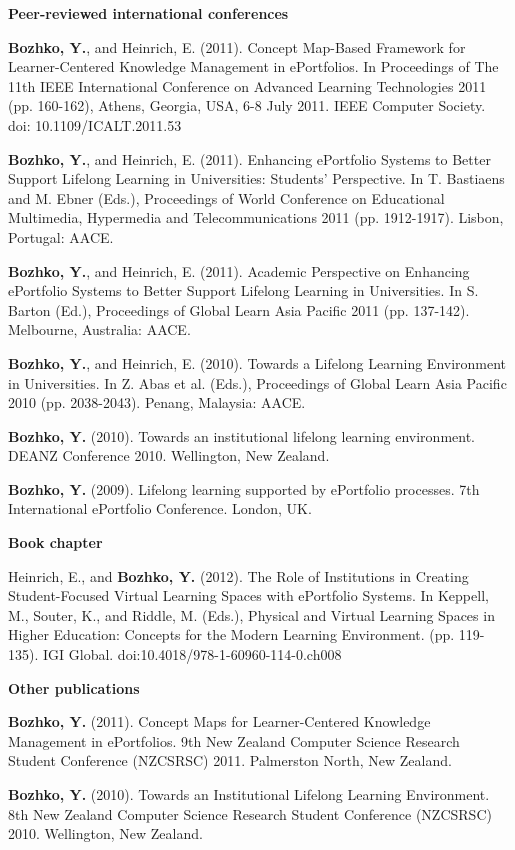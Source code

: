 \LARGE \textbf{Peer-reviewed international conferences}

\normalsize
\textbf{Bozhko, Y.}, and Heinrich, E. (2011). Concept Map-Based Framework for
Learner-Centered Knowledge Management in ePortfolios. In Proceedings of The 11th
IEEE International Conference on Advanced Learning Technologies 2011 (pp.
160-162), Athens, Georgia, USA, 6-8 July 2011. IEEE Computer Society. doi:
10.1109/ICALT.2011.53

\textbf{Bozhko, Y.}, and Heinrich, E. (2011). Enhancing ePortfolio Systems to
Better Support Lifelong Learning in Universities: Students' Perspective. In T.
Bastiaens and M. Ebner (Eds.), Proceedings of World Conference on Educational
Multimedia, Hypermedia and Telecommunications 2011 (pp. 1912-1917). Lisbon,
Portugal: AACE.

\textbf{Bozhko, Y.}, and Heinrich, E. (2011). Academic Perspective on Enhancing
ePortfolio Systems to Better Support Lifelong Learning in Universities. In S.
Barton (Ed.), Proceedings of Global Learn Asia Pacific 2011 (pp. 137-142).
Melbourne, Australia: AACE.

﻿\textbf{Bozhko, Y.}, and Heinrich, E. (2010). Towards a Lifelong Learning
Environment in Universities. In Z. Abas et al. (Eds.), Proceedings of Global
Learn Asia Pacific 2010 (pp. 2038-2043). Penang, Malaysia: AACE. 

\textbf{Bozhko, Y.} (2010). Towards an institutional lifelong learning
environment. DEANZ Conference 2010. Wellington, New Zealand.

\textbf{Bozhko, Y.} (2009). Lifelong learning supported by ePortfolio processes.
7th International ePortfolio Conference. London, UK.

\LARGE \textbf{Book chapter}

\normalsize
Heinrich, E., and \textbf{Bozhko, Y.} (2012). The Role of Institutions in Creating
Student-Focused Virtual Learning Spaces with ePortfolio Systems. In Keppell, M.,
Souter, K., and Riddle, M. (Eds.), Physical and Virtual Learning Spaces in
Higher Education: Concepts for the Modern Learning Environment. (pp. 119-135). 
IGI Global. doi:10.4018/978-1-60960-114-0.ch008

\LARGE \textbf{Other publications}

\normalsize
\textbf{Bozhko, Y.} (2011). Concept Maps for Learner-Centered Knowledge
Management in ePortfolios. 9th New Zealand Computer Science Research Student Conference
(NZCSRSC) 2011. Palmerston North, New Zealand.

\textbf{Bozhko, Y.} (2010). Towards an Institutional Lifelong Learning
Environment. 8th New Zealand Computer Science Research Student Conference (NZCSRSC) 2010.
Wellington, New Zealand.




